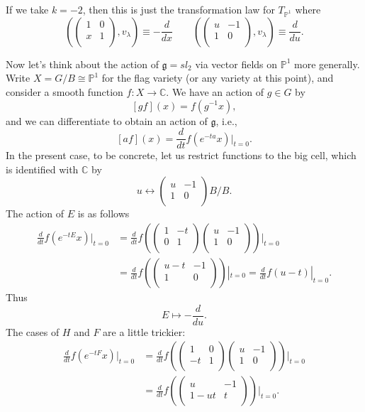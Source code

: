 \documentclass[12pt]{article}
\theoremstyle{plain}
\theoremstyle{definition}
\numberwithin{equation}{section}
\newcommand{\la}{\lambda}
\newcommand{\C}{\mathbb{C}}
\newcommand{\bbP}{\mathbb{P}}
\newcommand{\g}{\mathfrak{g}}
\begin{document}
If we take $k = -2$, then this is just the transformation law for $T_{\bbP^1}$ where
\[(\left(
\begin{array}{cc}
1 & 0 \\
x & 1 \\
\end{array}
\right), v_\la) \equiv -\frac{d}{dx} \qquad (\left(
\begin{array}{cc}
u & -1 \\
1 & 0 \\
\end{array}
\right), v_\la) \equiv \frac{d}{du}.
\]

Now let's think about the action of $\g = sl_2$ via vector fields on $\bbP^1$ more generally. Write $X = G/B \cong \bbP^1$ for the flag variety (or any variety at this point), and consider a smooth function $f : X \rightarrow \C$. We have an action of $g \in G$ by
\[
[g f](x) = f(g^{-1}x),
\]
and we can differentiate to obtain an action of $\g$, i.e.,
\[
[a f](x) = \frac{d}{dt} f(e^{-ta} x) |_{t=0}.
\]
In the present case, to be concrete, let us restrict functions to the big cell, which is identified with $\C$ by
\[
u \leftrightarrow \left(
\begin{array}{cc}
u & -1 \\
1 & 0 \\
\end{array}
\right) B / B.
\]
The action of $E$ is as follows
\begin{align*}
\frac{d}{dt} f(e^{-tE} x) |_{t=0} &= \frac{d}{dt} f( \left(
\begin{array}{cc}
1 & -t \\
0 & 1 \\
\end{array}
\right)\left(
\begin{array}{cc}
u & -1 \\
1 & 0 \\
\end{array}
\right) )|_{t=0} \\
%
&= \frac{d}{dt} f( \left(
\begin{array}{cc}
u-t & -1 \\
1 & 0 \\
\end{array}
\right) )|_{t=0} = \frac{d}{dt} f(u-t) |_{t=0}.
\end{align*}
Thus
\[
E \mapsto -\frac{d}{du}.
\]
The cases of $H$ and $F$ are a little trickier:
\begin{align*}
\frac{d}{dt} f(e^{-tF} x) |_{t=0} &= \frac{d}{dt} f( \left(
\begin{array}{cc}
1 & 0 \\
-t & 1 \\
\end{array}
\right)\left(
\begin{array}{cc}
u & -1 \\
1 & 0 \\
\end{array}
\right) )|_{t=0} \\
%
&= \frac{d}{dt} f( \left(
\begin{array}{cc}
u & -1 \\
1-ut & t \\
\end{array}
\right) )|_{t=0}.
\end{align*}
\end{document}
